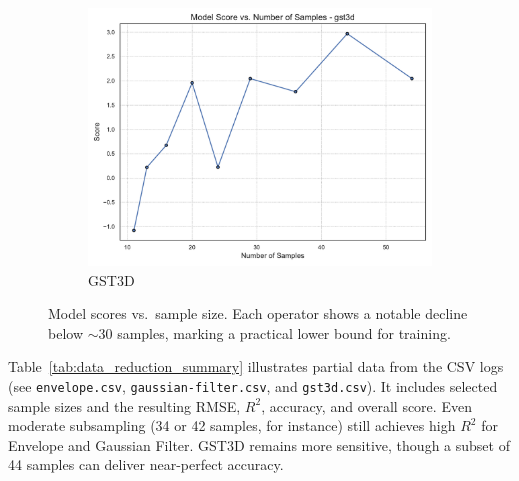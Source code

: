 \begin{figure}[htbp]
\begin{subfigure}[t]{0.32\textwidth}
        \includegraphics[width=\textwidth]{assets/images/05/score_by_sample_size_gst3d}
        \caption{\ac{GST3D}}
    \end{subfigure}
    \caption{Model scores vs.\ sample size.
    Each operator shows a notable decline below \(\sim\)30 samples, marking a practical lower bound for training.}
    \label{fig:score_by_sample_size_operators}
\end{figure}

Table~\ref{tab:data_reduction_summary} illustrates partial data from the CSV logs (see \texttt{envelope.csv}, \texttt{gaussian-filter.csv}, and \texttt{gst3d.csv}).
It includes selected sample sizes and the resulting \ac{RMSE}, $R^2$, accuracy, and overall score.
Even moderate subsampling (34 or 42 samples, for instance) still achieves high $R^2$ for Envelope and Gaussian Filter.
\ac{GST3D} remains more sensitive, though a subset of 44 samples can deliver near-perfect accuracy.

